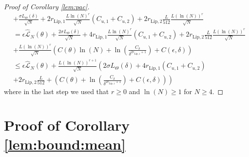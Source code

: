 \documentclass{article}
\begin{document}
\begin{proof}[Proof of Corollary \ref{lem:pac}]
\begin{align*}
           & + \frac{\sigma L_{\Theta}(\delta)}{\sqrt{N}}+2r_{\text{Lip},1}\frac{L\ln(N)^{r}}{\sqrt{N}}\left(C_{u,1} + C_{u,2}\right) + 2r_{\text{Lip},2}  \frac{L}{512} \frac{L(\ln(N))^r}{\sqrt{N}} \\
           & = \epsilon \hat{\mathcal{L}}_N(\theta)+\frac{2\sigma L_{\Theta}(\delta)}{\sqrt{N}} 
            + 4r_{\text{Lip},1}\frac{L\ln(N)^{r}}{\sqrt{N}}\left(C_{u,1} + C_{u,2}\right) + 2r_{\text{Lip},2}  \frac{L}{512} \frac{L(\ln(N))^r}{\sqrt{N}}  \\
           & + \frac{L(\ln(N))^r}{\sqrt{N}} \left(C(\theta) \ln(N) + \ln\left(\frac{C_{\delta}}{\delta^{2r_{\text{Lip},1}+1}}\right) + C(\epsilon,\delta) \right) \\
           & \le \epsilon \hat{\mathcal{L}}_N(\theta) + \frac{L(\ln(N))^{r+1}}{\sqrt{N}} \left(2\sigma L_{\Theta}(\delta)+4r_{\text{Lip},1}\left(C_{u,1} + C_{u,2}\right)  \right. \\
           & \left. + 2r_{\text{Lip},2}  \frac{L}{512}+ \left(C(\theta) + \ln\left(\frac{C_{\delta}}{\delta^{2r_{\text{Lip},1}+1}}\right) + C(\epsilon,\delta) \right)
           \right)
\end{align*}
where in the last step we used that $r \ge 0$ and $\ln(N) \ge 1$ for $N \ge 4$.
\end{proof}


\section{Proof of Corollary \ref{lem:bound:mean}}
\label{sec:proof_single_draw}
\end{document}
